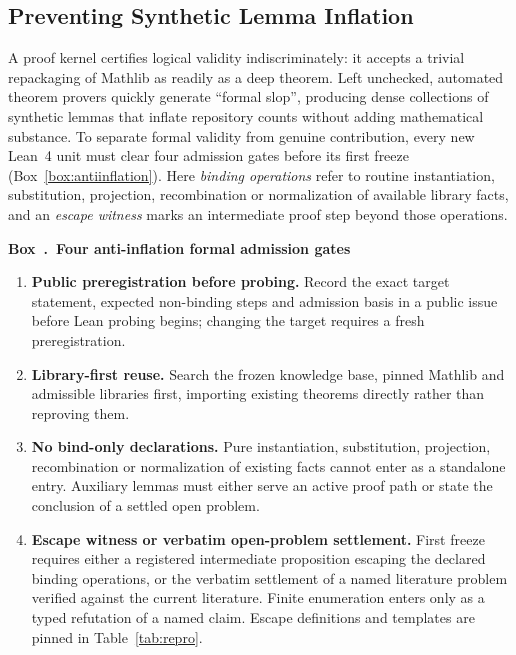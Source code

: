 \documentclass[11pt,a4paper]{article}
\newcounter{protocolbox}
\newenvironment{protocol}[1]{\refstepcounter{protocolbox}\begin{framed}\noindent\textbf{Box~\theprotocolbox.\ #1}\par\small}{\end{framed}}
\begin{document}
\subsection{Preventing Synthetic Lemma Inflation}
\label{sec:admission}
A proof kernel certifies logical validity indiscriminately: it accepts a
trivial repackaging of Mathlib as readily as a deep theorem. Left unchecked,
automated theorem provers quickly generate ``formal slop'', producing dense
collections of synthetic lemmas that inflate repository counts without adding
mathematical substance. To separate formal validity from genuine contribution,
every new Lean~4 unit must clear four admission gates before its first freeze
(Box~\ref{box:antiinflation}). Here \emph{binding operations} refer to routine
instantiation, substitution, projection, recombination or normalization of
available library facts, and an \emph{escape witness} marks an intermediate
proof step beyond those operations.

\noindent\begin{minipage}{\linewidth}
\begin{protocol}{Four anti-inflation formal admission gates}
\label{box:antiinflation}
\begin{enumerate}
\item \textbf{Public preregistration before probing.} Record the exact target
statement, expected non-binding steps and admission basis in a public issue
before Lean probing begins; changing the target requires a fresh
preregistration.
\item \textbf{Library-first reuse.} Search the frozen knowledge base, pinned
Mathlib and admissible libraries first, importing existing theorems directly
rather than reproving them.
\item \textbf{No bind-only declarations.} Pure instantiation, substitution,
projection, recombination or normalization of existing facts cannot enter as a
standalone entry. Auxiliary lemmas must either serve an active proof path or
state the conclusion of a settled open problem.
\item \textbf{Escape witness or verbatim open-problem settlement.} First freeze
requires either a registered intermediate proposition escaping the declared
binding operations, or the verbatim settlement of a named literature problem
verified against the current literature. Finite enumeration enters only as a
typed refutation of a named claim. Escape definitions and templates are pinned
in Table~\ref{tab:repro}.
\end{enumerate}
\end{protocol}
\end{minipage}
\end{document}
